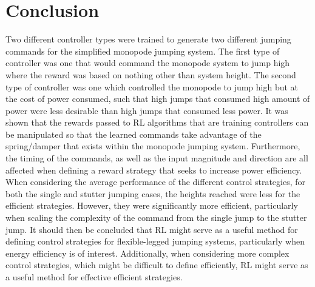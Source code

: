\section{Conclusion}
Two different controller types were trained to generate two different jumping commands for the simplified monopode jumping system. The first type of controller was one that would command the monopode system to jump high where the reward was based on nothing other than system height. The second type of controller was one which controlled the monopode to jump high but at the cost of power consumed, such that high jumps that consumed high amount of power were less desirable than high jumps that consumed less power. It was shown that the rewards passed to RL algorithms that are training controllers can be manipulated so that the learned commands take advantage of the spring/damper that exists within the monopode jumping system. Furthermore, the timing of the commands, as well as the input magnitude and direction are all affected when defining a reward strategy that seeks to increase power efficiency. When considering the average performance of the different control strategies, for both the single and stutter jumping cases, the heights reached were less for the efficient strategies. However, they were significantly more efficient, particularly when scaling the complexity of the command from the single jump to the stutter jump. It should then be concluded that RL might serve as a useful method for defining control strategies for flexible-legged jumping systems, particularly when energy efficiency is of interest. Additionally, when considering more complex control strategies, which might be difficult to define efficiently, RL might serve as a useful method for effective efficient strategies.